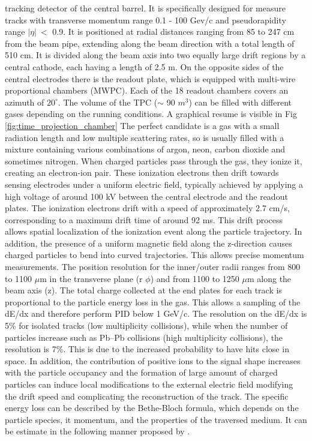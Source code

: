 \documentclass[12pt,a4paper]{book}
\begin{document}
	tracking detector of the central barrel. It is specifically designed for measure tracks with transverse momentum range 0.1 - 100 Gev/c and pseudorapidity range $|\eta| \ <$ 0.9.  It is positioned at radial distances ranging from 85 to 247 cm from the beam pipe, extending along the beam direction with a total length of 510 cm. It is divided along the beam axis into two equally large drift regions by a central cathode, each having a length of 2.5 m. On the opposite sides of the central electrodes there is the readout plate, which is equipped with multi-wire proportional chambers (MWPC). Each of the 18 readout chambers covers an azimuth of $20^{\circ}$. The volume of the TPC ($\sim$ 90 $m^3$) can be filled with different gases depending on the running conditions. A graphical resume is visible in Fig \ref{fig:time_projection_chamber} The perfect candidate is a gas with a small radiation length and low multiple scattering rates, so is usually filled with a mixture containing various combinations of argon, neon, carbon dioxide and sometimes nitrogen. When charged particles pass through the gas, they ionize it, creating an electron-ion pair. These ionization electrons then drift towards sensing electrodes under a uniform electric field, typically achieved by applying a high voltage of around 100 kV between the central electrode and the readout plates. The ionization electrons drift with a speed of approximately 2.7 cm/s, corresponding to a maximum drift time of around 92 ms. This drift process allows spatial localization of the ionization event along the particle trajectory. In addition, the presence of a uniform magnetic field along the z-direction causes charged particles to bend into curved trajectories. This allows precise momentum measurements.  The position resolution for the inner/outer radii ranges from 800 to 1100 $\mu$m in the transverse plane (r $\phi$) and from 1100 to 1250 $\mu$m along the beam axis (z). The total charge collected at the end plates for each track is proportional to the particle energy loss in the gas. This allows a sampling of the dE/dx and therefore perform PID below 1 GeV/c. The resolution on the dE/dx is 5\% for isolated tracks (low multiplicity collisions), while when the number of particles increase such as Pb–Pb collisions (high multiplicity collisions), the resolution is 7\%. This is due to the increased probability to have hits close in space. In addition, the contribution of positive ions to the signal shape increases with the particle occupancy and the formation of large amount of charged particles can induce local modifications to the external electric field modifying the drift speed and complicating the reconstruction of the track. The specific energy loss can be described by the Bethe-Bloch formula, which depends on the particle species, it momentum, and the properties of the traversed medium. It can be estimate in the following manner proposed by \cite{Rolandi:2008ujz}.
\end{document}

